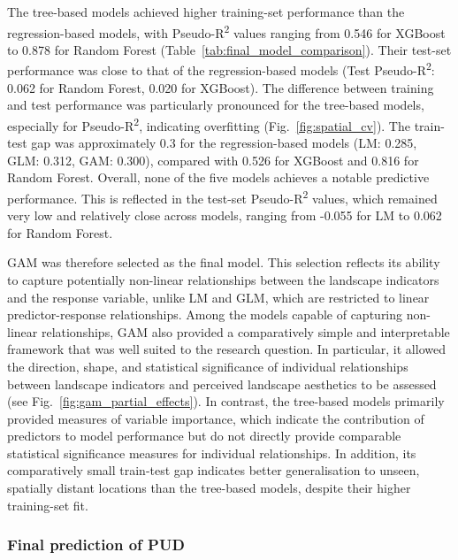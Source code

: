 \documentclass[11pt]{article}
\renewcommand{\_}{\textunderscore\allowbreak{}}
\begin{document}
The tree-based models achieved higher training-set performance than the regression-based models, with Pseudo-R\textsuperscript{2} values ranging from 0.546 for XGBoost to 0.878 for Random Forest (Table~\ref{tab:final_model_comparison}). Their test-set performance was close to that of the regression-based models (Test Pseudo-R\textsuperscript{2}: 0.062 for Random Forest, 0.020 for XGBoost). The difference between training and test performance was particularly pronounced for the tree-based models, especially for Pseudo-R\textsuperscript{2}, indicating overfitting (Fig.~\ref{fig:spatial_cv}). The train-test gap was approximately 0.3 for the regression-based models (LM: 0.285, GLM: 0.312, GAM: 0.300), compared with 0.526 for XGBoost and 0.816 for Random Forest. Overall, none of the five models achieves a notable predictive performance. This is reflected in the test-set Pseudo-R\textsuperscript{2} values, which remained very low and relatively close across models, ranging from -0.055 for LM to 0.062 for Random Forest.

GAM was therefore selected as the final model. This selection reflects its ability to capture potentially non-linear relationships between the landscape indicators and the response variable, unlike LM and GLM, which are restricted to linear predictor-response relationships. Among the models capable of capturing non-linear relationships, GAM also provided a comparatively simple and interpretable framework that was well suited to the research question. In particular, it allowed the direction, shape, and statistical significance of individual relationships between landscape indicators and perceived landscape aesthetics to be assessed (see Fig.~\ref{fig:gam_partial_effects}). In contrast, the tree-based models primarily provided measures of variable importance, which indicate the contribution of predictors to model performance but do not directly provide comparable statistical significance measures for individual relationships. In addition, its comparatively small train-test gap indicates better generalisation to unseen, spatially distant locations than the tree-based models, despite their higher training-set fit.

\subsubsection{Final prediction of PUD}
\end{document}
